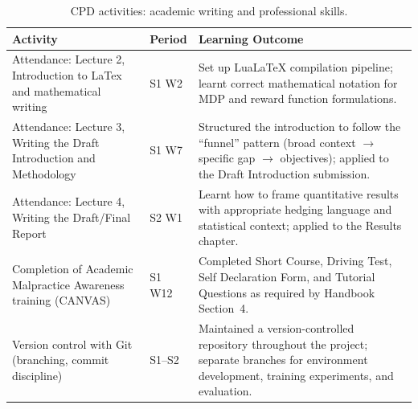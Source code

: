 \begin{table}[H]
\centering
\caption{CPD activities: academic writing and professional skills.}
\label{tab:cpd_writing}
\begin{tabularx}{\textwidth}{p{3.5cm} p{2cm} X}
\toprule
\textbf{Activity} & \textbf{Period} & \textbf{Learning Outcome} \\
\midrule
Attendance: Lecture 2, Introduction to LaTex and mathematical writing & S1 W2 & Set up LuaLaTeX compilation pipeline; learnt correct mathematical notation for MDP and reward function formulations. \\
\midrule
Attendance: Lecture 3, Writing the Draft Introduction and Methodology & S1 W7 & Structured the introduction to follow the ``funnel'' pattern (broad context $\to$ specific gap $\to$ objectives); applied to the Draft Introduction submission. \\
\midrule
Attendance: Lecture 4, Writing the Draft/Final Report & S2 W1 & Learnt how to frame quantitative results with appropriate hedging language and statistical context; applied to the Results chapter. \\
\midrule
Completion of Academic Malpractice Awareness training (CANVAS) & S1 W12 & Completed Short Course, Driving Test, Self Declaration Form, and Tutorial Questions as required by Handbook Section~4. \\
\midrule
Version control with Git (branching, commit discipline) & S1--S2 & Maintained a version-controlled repository throughout the project; separate branches for environment development, training experiments, and evaluation. \\
\bottomrule
\end{tabularx}
\end{table}
